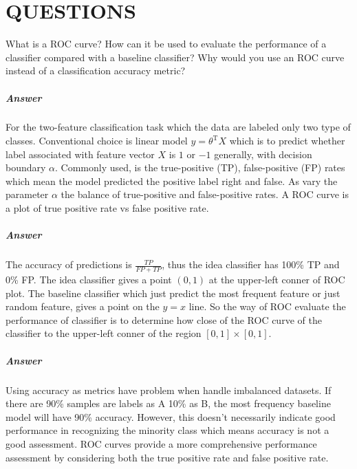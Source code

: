 
    
\chapter{Q\normalsize{UESTIONS}}
\titleformat{\paragraph}[runin]
{\normalsize\itshape\bfseries}{\theparagraph}{1em}{}

\thequestion What is a ROC curve? How can it be used to evaluate the performance of a classifier
compared with a baseline classifier? Why would you use an ROC curve instead of a
classification accuracy metric? 

\paragraph{Answer}
For the two-feature classification task
which the data are labeled only two type of classes. 
Conventional choice is linear model $y = \theta^{\text{T}} X$ 
which is to predict whether label associated with feature vector $X$ is $1$ or $−1$ 
generally, with decision boundary $\alpha$.
Commonly used, is the true-positive (TP), false-positive (FP) rates which mean 
the model predicted the positive label right and false.
As vary the parameter $\alpha$ the balance of true-positive and false-positive rates.
A ROC curve is a plot of true positive rate vs false
positive rate.

\paragraph{Answer}
The accuracy of predictions is $\frac{TP}{FP+TP}$, thus the idea classifier 
has 100\% TP and 0\% FP. 
The idea classifier gives a point $(0,1)$ at the upper-left conner of 
ROC plot. 
The baseline classifier which just predict the most frequent feature or 
just random feature, gives a point on the $y=x$ line.
So the way of ROC evaluate the performance of classifier is to 
determine how close of the ROC curve of the classifier to the upper-left conner of 
the region $[0,1]\times [0,1]$.

\paragraph{Answer}
Using accuracy as metrics have problem when handle imbalanced datasets.
If there are 90\% samples are labels as A 10\% as B, the most frequency 
baseline model will have 90\% accuracy.
However, this doesn't necessarily indicate good performance in recognizing the minority class
which means accuracy is not a good assessment.
ROC curves provide a more comprehensive performance assessment 
by considering both the true positive rate and false positive rate.

